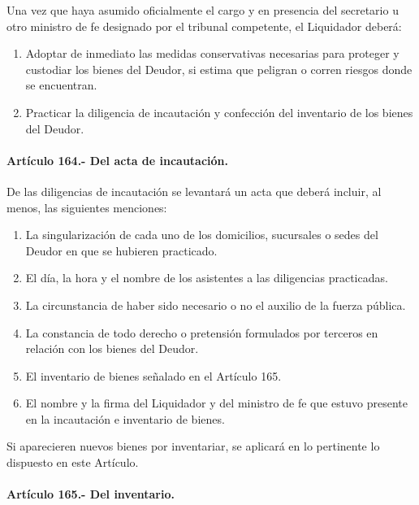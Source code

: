 \documentclass[
]{book}
\begin{document}
Una vez que haya asumido oficialmente el cargo y en presencia del secretario u otro ministro de fe designado por el tribunal competente, el Liquidador deberá:

\begin{enumerate}
\def\labelenumi{\arabic{enumi})}
\item
  Adoptar de inmediato las medidas conservativas necesarias para proteger y custodiar los bienes del Deudor, si estima que peligran o corren riesgos donde se encuentran.
\item
  Practicar la diligencia de incautación y confección del inventario de los bienes del Deudor.
\end{enumerate}

\hypertarget{artuxedculo-164.--del-acta-de-incautaciuxf3n.}{%
\paragraph*{Artículo 164.- Del acta de incautación.}\label{artuxedculo-164.--del-acta-de-incautaciuxf3n.}}

De las diligencias de incautación se levantará un acta que deberá incluir, al menos, las siguientes menciones:

\begin{enumerate}
\def\labelenumi{\arabic{enumi})}
\item
  La singularización de cada uno de los domicilios, sucursales o sedes del Deudor en que se hubieren practicado.
\item
  El día, la hora y el nombre de los asistentes a las diligencias practicadas.
\item
  La circunstancia de haber sido necesario o no el auxilio de la fuerza pública.
\item
  La constancia de todo derecho o pretensión formulados por terceros en relación con los bienes del Deudor.
\item
  El inventario de bienes señalado en el Artículo 165.
\item
  El nombre y la firma del Liquidador y del ministro de fe que estuvo presente en la incautación e inventario de bienes.
\end{enumerate}

Si aparecieren nuevos bienes por inventariar, se aplicará en lo pertinente lo dispuesto en este Artículo.

\hypertarget{artuxedculo-165.--del-inventario.}{%
\paragraph*{Artículo 165.- Del inventario.}\label{artuxedculo-165.--del-inventario.}}
\end{document}
